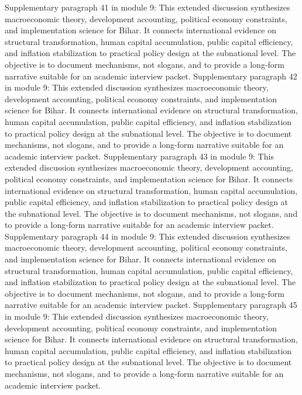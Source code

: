 \documentclass[preprint,12pt]{elsarticle}
\begin{document}
Supplementary paragraph 41 in module 9: This extended discussion synthesizes macroeconomic theory, development accounting, political economy constraints, and implementation science for Bihar. It connects international evidence on structural transformation, human capital accumulation, public capital efficiency, and inflation stabilization to practical policy design at the subnational level. The objective is to document mechanisms, not slogans, and to provide a long-form narrative suitable for an academic interview packet.
Supplementary paragraph 42 in module 9: This extended discussion synthesizes macroeconomic theory, development accounting, political economy constraints, and implementation science for Bihar. It connects international evidence on structural transformation, human capital accumulation, public capital efficiency, and inflation stabilization to practical policy design at the subnational level. The objective is to document mechanisms, not slogans, and to provide a long-form narrative suitable for an academic interview packet.
Supplementary paragraph 43 in module 9: This extended discussion synthesizes macroeconomic theory, development accounting, political economy constraints, and implementation science for Bihar. It connects international evidence on structural transformation, human capital accumulation, public capital efficiency, and inflation stabilization to practical policy design at the subnational level. The objective is to document mechanisms, not slogans, and to provide a long-form narrative suitable for an academic interview packet.
Supplementary paragraph 44 in module 9: This extended discussion synthesizes macroeconomic theory, development accounting, political economy constraints, and implementation science for Bihar. It connects international evidence on structural transformation, human capital accumulation, public capital efficiency, and inflation stabilization to practical policy design at the subnational level. The objective is to document mechanisms, not slogans, and to provide a long-form narrative suitable for an academic interview packet.
Supplementary paragraph 45 in module 9: This extended discussion synthesizes macroeconomic theory, development accounting, political economy constraints, and implementation science for Bihar. It connects international evidence on structural transformation, human capital accumulation, public capital efficiency, and inflation stabilization to practical policy design at the subnational level. The objective is to document mechanisms, not slogans, and to provide a long-form narrative suitable for an academic interview packet.
\end{document}
